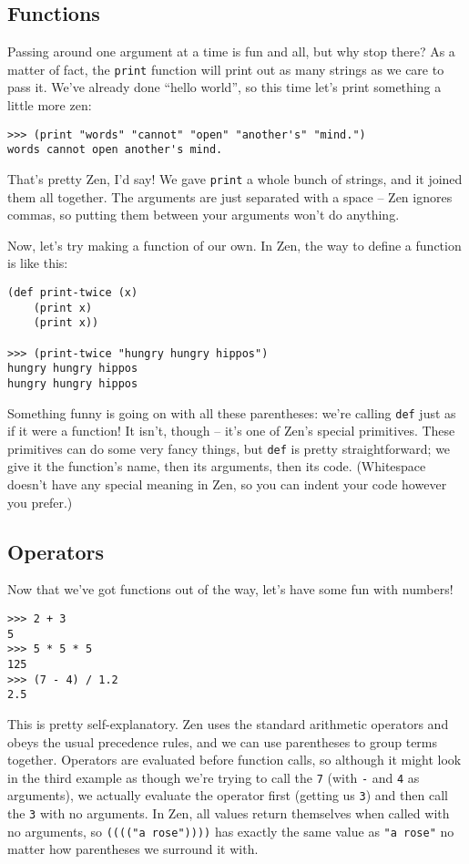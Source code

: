 \documentclass{article}
\begin{document}
\subsection{Functions}
Passing around one argument at a time is fun and all, but why stop there? As a matter of fact, the \lstinline{print} function will print out as many strings as we care to pass it. We've already done ``hello world'', so this time let's print something a little more zen:

\begin{lstlisting}
>>> (print "words" "cannot" "open" "another's" "mind.")
words cannot open another's mind.
\end{lstlisting}

That's pretty Zen, I'd say! We gave \lstinline{print} a whole bunch of strings, and it joined them all together. The arguments are just separated with a space -- Zen ignores commas, so putting them between your arguments won't do anything.

Now, let's try making a function of our own. In Zen, the way to define a function is like this:

\begin{lstlisting}
(def print-twice (x)
	(print x)
	(print x))
	
>>> (print-twice "hungry hungry hippos")
hungry hungry hippos
hungry hungry hippos
\end{lstlisting}

Something funny is going on with all these parentheses: we're calling \lstinline{def} just as if it were a function! It isn't, though -- it's one of Zen's special primitives. These primitives can do some very fancy things, but \lstinline{def} is pretty straightforward; we give it the function's name, then its arguments, then its code. (Whitespace doesn't have any special meaning in Zen, so you can indent your code however you prefer.)


\subsection{Operators}
Now that we've got functions out of the way, let's have some fun with numbers!

\begin{lstlisting}
>>> 2 + 3
5
>>> 5 * 5 * 5
125
>>> (7 - 4) / 1.2
2.5
\end{lstlisting}

This is pretty self-explanatory. Zen uses the standard arithmetic operators and obeys the usual precedence rules, and we can use parentheses to group terms together. Operators are evaluated before function calls, so although it might look in the third example as though we're trying to call the \lstinline{7} (with \lstinline{-} and \lstinline{4} as arguments), we actually evaluate the operator first (getting us \lstinline{3}) and then call the \lstinline{3} with no arguments. In Zen, all values return themselves when called with no arguments, so \lstinline{(((("a rose"))))} has exactly the same value as \lstinline{"a rose"} no matter how parentheses we surround it with.
\end{document}
